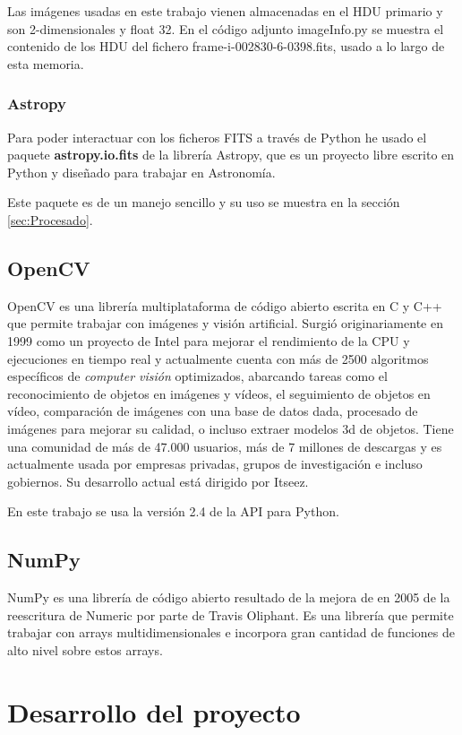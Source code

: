\documentclass[a4paper,12pt]{article}
\begin{document}
Las imágenes usadas en este trabajo vienen almacenadas en el HDU primario y son 2-dimensionales y float 32. En el código adjunto imageInfo.py se muestra el contenido de los HDU del fichero frame-i-002830-6-0398.fits, usado a lo largo de esta memoria.
\subsubsection{Astropy}
Para poder interactuar con los ficheros FITS a través de Python he usado el paquete \textbf{astropy.io.fits} de la librería Astropy\cite{astropy}, que es un proyecto libre escrito en Python y diseñado para trabajar en Astronomía.

Este paquete es de un manejo sencillo y su uso se muestra en la sección \ref{sec:Procesado}.
\subsection{OpenCV}
OpenCV\cite{opencv,oreilly} es una librería multiplataforma de código abierto escrita en C y C++ que permite trabajar con imágenes y visión artificial. Surgió originariamente en 1999 como un proyecto de Intel para mejorar el rendimiento de la CPU y ejecuciones en tiempo real y actualmente cuenta con más de 2500 algoritmos específicos de \textit{computer visión} optimizados, abarcando tareas como el reconocimiento de objetos en imágenes y vídeos, el seguimiento de objetos en vídeo, comparación de imágenes con una base de datos dada, procesado de imágenes para mejorar su calidad, o incluso extraer modelos 3d de objetos. Tiene una comunidad de más de 47.000 usuarios, más de 7 millones de descargas y es actualmente usada por empresas privadas, grupos de investigación e incluso gobiernos. Su desarrollo actual está dirigido por Itseez.

En este trabajo se usa la versión 2.4 de la API para Python.
\subsection{NumPy}
NumPy\cite{numpy} es una librería de código abierto resultado de la mejora de en 2005 de la reescritura de Numeric por parte de Travis Oliphant. Es una librería que permite trabajar con arrays multidimensionales e incorpora gran cantidad de funciones de alto nivel sobre estos arrays.
\section{Desarrollo del proyecto}
\label{sec:desarrollo}
\end{document}
